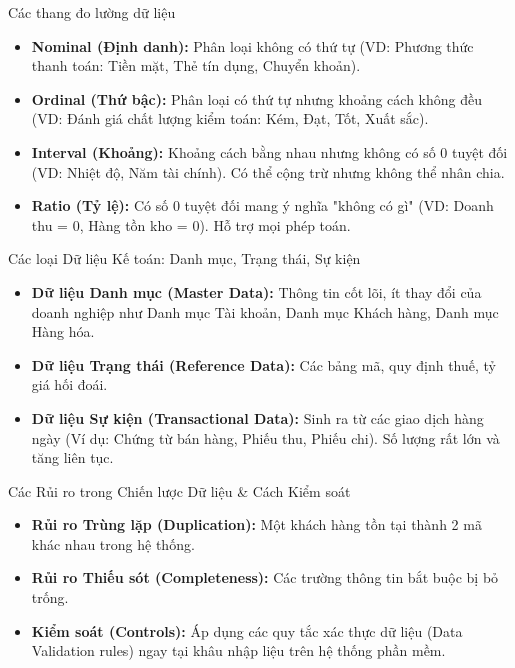 \documentclass[aspectratio=169,12pt]{beamer}
\begin{document}
\begin{frame}{Các thang đo lường dữ liệu}
\begin{itemize}
    \item \textbf{Nominal (Định danh):} Phân loại không có thứ tự (VD: Phương thức thanh toán: Tiền mặt, Thẻ tín dụng, Chuyển khoản).
    \item \textbf{Ordinal (Thứ bậc):} Phân loại có thứ tự nhưng khoảng cách không đều (VD: Đánh giá chất lượng kiểm toán: Kém, Đạt, Tốt, Xuất sắc).
    \item \textbf{Interval (Khoảng):} Khoảng cách bằng nhau nhưng không có số 0 tuyệt đối (VD: Nhiệt độ, Năm tài chính). Có thể cộng trừ nhưng không thể nhân chia.
    \item \textbf{Ratio (Tỷ lệ):} Có số 0 tuyệt đối mang ý nghĩa "không có gì" (VD: Doanh thu = 0, Hàng tồn kho = 0). Hỗ trợ mọi phép toán.
\end{itemize}
\end{frame}

\begin{frame}{Các loại Dữ liệu Kế toán: Danh mục, Trạng thái, Sự kiện}
\begin{itemize}
    \item \textbf{Dữ liệu Danh mục (Master Data):} Thông tin cốt lõi, ít thay đổi của doanh nghiệp như Danh mục Tài khoản, Danh mục Khách hàng, Danh mục Hàng hóa.
    \item \textbf{Dữ liệu Trạng thái (Reference Data):} Các bảng mã, quy định thuế, tỷ giá hối đoái.
    \item \textbf{Dữ liệu Sự kiện (Transactional Data):} Sinh ra từ các giao dịch hàng ngày (Ví dụ: Chứng từ bán hàng, Phiếu thu, Phiếu chi). Số lượng rất lớn và tăng liên tục.
\end{itemize}
\end{frame}

\begin{frame}{Các Rủi ro trong Chiến lược Dữ liệu \& Cách Kiểm soát}
\begin{itemize}
    \item \textbf{Rủi ro Trùng lặp (Duplication):} Một khách hàng tồn tại thành 2 mã khác nhau trong hệ thống.
    \item \textbf{Rủi ro Thiếu sót (Completeness):} Các trường thông tin bắt buộc bị bỏ trống.
    \item \textbf{Kiểm soát (Controls):} Áp dụng các quy tắc xác thực dữ liệu (Data Validation rules) ngay tại khâu nhập liệu trên hệ thống phần mềm.
\end{itemize}
\end{frame}
\end{document}
